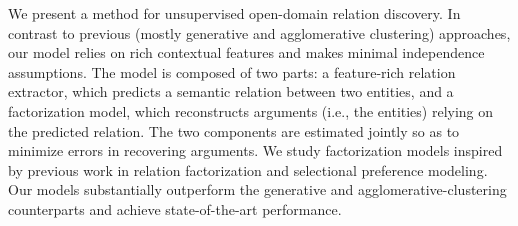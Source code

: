 We present a method for unsupervised open-domain relation discovery. In contrast to previous (mostly generative and agglomerative clustering) approaches, our model relies on rich contextual features and makes minimal independence assumptions. The model is composed of two parts: a feature-rich relation extractor, which predicts a semantic relation between two entities, and a factorization model, which reconstructs arguments (i.e., the entities) relying on the predicted relation. The two components are estimated jointly so as to minimize errors in recovering arguments. We study factorization models inspired by previous work in relation factorization and  selectional preference modeling. Our models substantially outperform the generative and agglomerative-clustering counterparts and achieve state-of-the-art performance.
